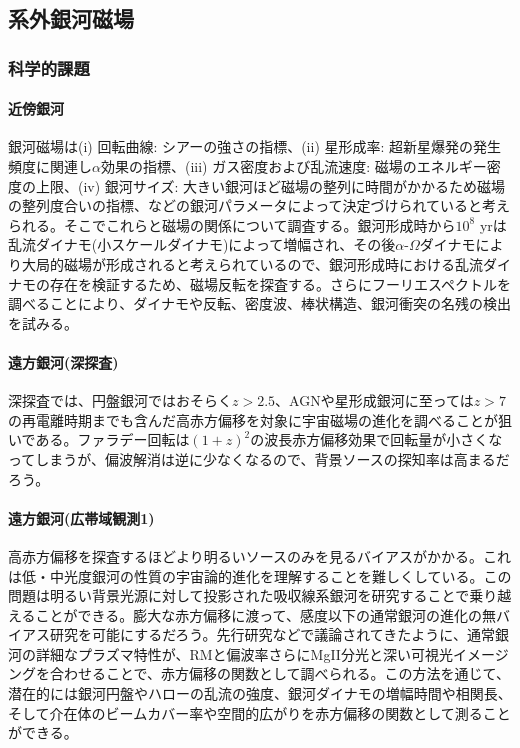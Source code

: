 \subsection{系外銀河磁場}
\label{c06.s2.ss3}

\subsubsection{科学的課題}
\label{c06.s2.ss3.sss1}

\paragraph{近傍銀河}

銀河磁場は(i) 回転曲線: シアーの強さの指標、(ii) 星形成率: 超新星爆発の発生頻度に関連し$\alpha$効果の指標、(iii) ガス密度および乱流速度: 磁場のエネルギー密度の上限、(iv) 銀河サイズ: 大きい銀河ほど磁場の整列に時間がかかるため磁場の整列度合いの指標、などの銀河パラメータによって決定づけられていると考えられる。そこでこれらと磁場の関係について調査する。銀河形成時から$10^8$ yrは乱流ダイナモ(小スケールダイナモ)によって増幅され、その後$\alpha$-$\Omega$ダイナモにより大局的磁場が形成されると考えられているので、銀河形成時における乱流ダイナモの存在を検証するため、磁場反転を探査する。さらにフーリエスペクトルを調べることにより、ダイナモや反転、密度波、棒状構造、銀河衝突の名残の検出を試みる。

\paragraph{遠方銀河(深探査)}

深探査では、円盤銀河ではおそらく$z>2.5$、AGNや星形成銀河に至っては$z>7$の再電離時期までも含んだ高赤方偏移を対象に宇宙磁場の進化を調べることが狙いである。ファラデー回転は$(1+z)^2$の波長赤方偏移効果で回転量が小さくなってしまうが、偏波解消は逆に少なくなるので、背景ソースの探知率は高まるだろう。

\paragraph{遠方銀河(広帯域観測1)}

高赤方偏移を探査するほどより明るいソースのみを見るバイアスがかかる。これは低・中光度銀河の性質の宇宙論的進化を理解することを難しくしている。この問題は明るい背景光源に対して投影された吸収線系銀河を研究することで乗り越えることができる。膨大な赤方偏移に渡って、感度以下の通常銀河の進化の無バイアス研究を可能にするだろう。先行研究\citep{2012ApJ...761..144B, 2013ApJ...772L..28B}などで議論されてきたように、通常銀河の詳細なプラズマ特性が、RMと偏波率さらにMgII分光と深い可視光イメージングを合わせることで、赤方偏移の関数として調べられる。この方法を通じて、潜在的には銀河円盤やハローの乱流の強度、銀河ダイナモの増幅時間や相関長、そして介在体のビームカバー率や空間的広がりを赤方偏移の関数として測ることができる\citep{2008ApJ...676...70K, 2012ApJ...761..144B, 2013ApJ...772L..28B}。

